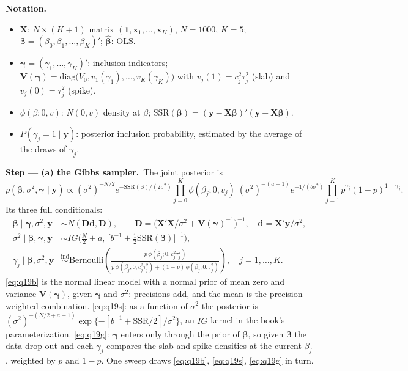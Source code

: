 \documentclass[11pt,a4paper]{article}
\newenvironment{notacao}{\par\smallskip\noindent\textbf{Notation.}\begin{itemize}[leftmargin=1.4em,topsep=1pt,itemsep=0pt]\small}{\end{itemize}}
\newcommand{\passo}[2]{\par\smallskip\noindent\textbf{Step --- #1.}~#2}
\begin{document}
\begin{sol}
\begin{notacao}
\item $\bm X$: $N\times(K+1)$ matrix $(\bm1,\bm x_1,\dots,\bm x_K)$, $N=1000$, $K=5$; $\bm\beta=(\beta_0,\beta_1,\dots,\beta_K)'$; $\hat{\bm\beta}$: OLS.
\item $\bm\gamma=(\gamma_1,\dots,\gamma_K)'$: inclusion indicators; $\bm V(\bm\gamma)=\mathrm{diag}\big(V_0,v_1(\gamma_1),\dots,v_K(\gamma_K)\big)$ with
$v_j(1)=c_j^2\tau_j^2$ (slab) and $v_j(0)=\tau_j^2$ (spike).
\item $\phi(\beta;0,v)$: $N(0,v)$ density at $\beta$; $\mathrm{SSR}(\bm\beta)=(\bm y-\bm X\bm\beta)'(\bm y-\bm X\bm\beta)$.
\item $P(\gamma_j=1\mid\bm y)$: posterior inclusion probability, estimated by the average of the draws of $\gamma_j$.
\end{notacao}

\passo{(a) the Gibbs sampler}{The joint posterior is
\[
p(\bm\beta,\sigma^2,\bm\gamma\mid\bm y)\propto(\sigma^2)^{-N/2}e^{-\mathrm{SSR}(\bm\beta)/(2\sigma^2)}
\prod_{j=0}^K\phi(\beta_j;0,v_j)\;(\sigma^2)^{-(a+1)}e^{-1/(b\sigma^2)}\prod_{j=1}^Kp^{\gamma_j}(1-p)^{1-\gamma_j}.
\]
Its three full conditionals:
\begin{align}
\bm\beta\mid\bm\gamma,\sigma^2,\bm y&\sim N(\bm D\bm d,\bm D),\qquad \bm D=\big(\bm X'\bm X/\sigma^2+\bm V(\bm\gamma)^{-1}\big)^{-1},\quad
\bm d=\bm X'\bm y/\sigma^2,\label{eq:q19b}\\
\sigma^2\mid\bm\beta,\bm\gamma,\bm y&\sim IG\Big(\frac N2+a,\ \big[b^{-1}+\tfrac12\mathrm{SSR}(\bm\beta)\big]^{-1}\Big),\label{eq:q19s}\\
\gamma_j\mid\bm\beta,\sigma^2,\bm y&\overset{\text{ind}}{\sim}\mathrm{Bernoulli}\left(\frac{p\,\phi(\beta_j;0,c_j^2\tau_j^2)}
{p\,\phi(\beta_j;0,c_j^2\tau_j^2)+(1-p)\,\phi(\beta_j;0,\tau_j^2)}\right),\quad j=1,\dots,K.\label{eq:q19g}
\end{align}
\eqref{eq:q19b} is the normal linear model with a normal prior of mean zero and variance $\bm V(\bm\gamma)$, given $\bm\gamma$ and
$\sigma^2$: precisions add, and the mean is the precision-weighted combination. \eqref{eq:q19s}: as a function of $\sigma^2$ the
posterior is $(\sigma^2)^{-(N/2+a+1)}\exp\{-[b^{-1}+\mathrm{SSR}/2]/\sigma^2\}$, an $IG$ kernel in the book's parameterization.
\eqref{eq:q19g}: $\bm\gamma$ enters only through the prior of $\bm\beta$, so given $\bm\beta$ the data drop out and each $\gamma_j$ compares
the slab and spike densities at the current $\beta_j$, weighted by $p$ and $1-p$. One sweep draws \eqref{eq:q19b}, \eqref{eq:q19s},
\eqref{eq:q19g} in turn.}


\end{sol}
\end{document}
